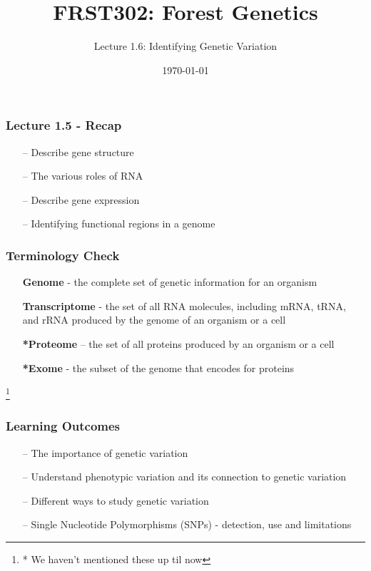 \documentclass{beamer}
\title{\Huge FRST302: Forest Genetics}
\author{\Large Lecture 1.6: Identifying Genetic Variation }
\date{\today}
\newcommand\blfootnote[1]{%
	\begingroup
	\renewcommand\thefootnote{}\footnote{#1}%
	\addtocounter{footnote}{-1}%
	\endgroup
}
\begin{document}
	\maketitle
	
	
	\begin{frame}
		\frametitle{Lecture 1.5 - Recap}
		\begin{itemize}
			\item[--] Describe gene structure
			\item[--] The various roles of RNA
			\item[--] Describe gene expression
			\item[--] Identifying functional regions in a genome
			
		\end{itemize}
	\end{frame}
	
	
	
	\begin{frame}
		\frametitle{Terminology Check}
		\begin{itemize}
\item[]\textbf{Genome} - the complete set of genetic information for an organism
\item[]\textbf{Transcriptome} - the set of all RNA molecules, including mRNA, tRNA, and rRNA produced by the genome of an organism or a cell
\item[]\textbf{*Proteome} – the set of all proteins produced by an organism or a cell
\item[] \textbf{*Exome} - the subset of the genome that encodes for proteins
		
		\end{itemize}
		\blfootnote{* We haven't mentioned these up til now}
	\end{frame}
	
	
	
\begin{frame}
\frametitle{Learning Outcomes}
\begin{itemize}
	\item[--] The importance of genetic variation
	\item[--] Understand phenotypic variation and its connection to genetic variation
	\item[--] Different ways to study genetic variation
	\item[--] Single Nucleotide Polymorphisms (SNPs) - detection, use and limitations
\end{itemize}
\end{frame}
	
\end{document}
